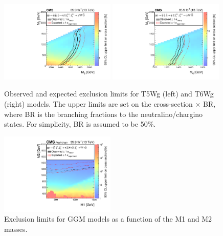 \documentclass[thesis.tex]{subfiles}
\renewcommand\_{\textunderscore\allowbreak}
\begin{document}
\begin{figure}
  \centering
    \includegraphics[width=0.49\textwidth]{Fig/Figure_007-a.pdf}
    \includegraphics[width=0.49\textwidth]{Fig/Figure_007-b.pdf}
		\caption{Observed and expected exclusion limits for T5Wg (left) and T6Wg (right) models. The upper limits are set on the cross-section $\times$ BR, where BR is the branching fractions to the neutralino/chargino states. For simplicity, BR is assumed to be 50\%. }
    \label{fig:t5wglimit}
\end{figure}

\begin{figure}
  \centering
    \includegraphics[width=0.49\textwidth]{Fig/GGMXSEC.pdf}
    \caption{Exclusion limits for GGM models as a function of the M1 and M2 masses.}
     \label{fig:M1M2limit}
\end{figure}
\end{document}
